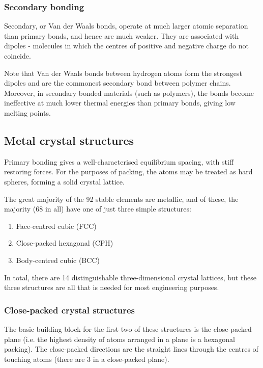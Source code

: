 \documentclass{article}
\begin{document}
\subsubsection{Secondary bonding}

Secondary, or Van der Waals bonds, operate at much larger atomic separation than primary bonds, and hence are much weaker. They are associated with dipoles - molecules in which the centres of positive and negative charge do not coincide.

Note that Van der Waals bonds between hydrogen atoms form the strongest dipoles and are the commonest secondary bond between polymer chains. Moreover, in secondary bonded materials (such as polymers), the bonds become ineffective at much lower thermal energies than primary bonds, giving low melting points.

\newpage

\subsection{Metal crystal structures}

Primary bonding gives a well-characterised equilibrium spacing, with stiff restoring forces. For the
purposes of packing, the atoms may be treated as hard spheres, forming a solid crystal lattice.

The great majority of the 92 stable elements are metallic, and of these, the majority (68 in all) have one of
just three simple structures: 

\begin{enumerate}
    \item Face-centred cubic (FCC)
    \item Close-packed hexagonal (CPH)
    \item Body-centred cubic (BCC)
\end{enumerate}

In total, there are 14 distinguishable three-dimensional crystal lattices, but these three structures are all that is needed for most engineering purposes.

\subsubsection{Close-packed crystal structures}

The basic building block for the first two of these structures is the
close-packed plane (i.e. the highest density of atoms arranged in a
plane is a hexagonal packing).
The close-packed directions are the straight lines through the centres
of touching atoms (there are 3 in a close-packed plane).
\end{document}
